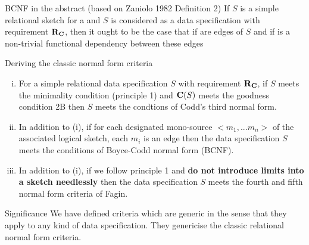 \begin{frame}{BCNF in the abstract (based on Zaniolo 1982 Definition 2)}
If $S$ is a simple relational sketch for a \datacatw \catcw 
and $S$ is considered as a data specification with requirement $\textbf{R}_{\textbf{C}}$, then it ought to be the case
that if 
are edges of $S$
and if   is a non-trivial functional dependency  between these edges
\end{frame}

\begin{frame}{Deriving the classic normal form criteria}
\begin{lemma}
\begin{enumerate}[(i)]
\item For a simple relational data specification $S$ with requirement $\textbf{R}_{\textbf{C}}$, if $S$ meets the minimality condition (principle 1) and $\textbf{C}(S)$ meets the goodness condition 2B then $S$ meets the condtions of Codd's third normal form.
\item In addition to (i), if for each designated mono-source $<m_1, ...m_n>$ of the associated logical sketch,
each $m_i$ is an edge then the data specification $S$ meets the conditions of Boyce-Codd normal form (BCNF).
\item In addition to (i), if we follow principle 1 and \textbf{do not introduce
limits into a sketch needlessly} then the data specification $S$ meets the 
fourth and fifth normal form criteria of Fagin.
\end{enumerate}
\end{lemma}
\pause \begin{block}{Significance}
We have defined criteria which are generic in the sense that they apply to any kind of data specification. They genericise the classic relational normal form criteria.
\end{block}
\end{frame}

